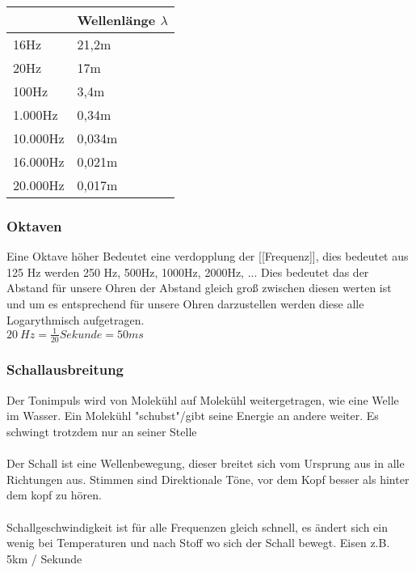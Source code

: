 \begin{table}[h]
\begin{center}
\begin{tabular}{l|l}
\hline
\rowcolor{YellowGreen!50!} \multicolumn{1}{|l|}{Frequenz} & \multicolumn{1}{l|}{Wellenlänge $\lambda$} \\ \hline
16Hz                           & 21,2m                                      \\
20Hz                           & 17m                                        \\
100Hz                          & 3,4m                                       \\
1.000Hz                        & 0,34m                                      \\
10.000Hz                       & 0,034m                                     \\
16.000Hz                       & 0,021m                                     \\
20.000Hz                       & 0,017m                                    
\end{tabular}
\end{center}
\end{table}
\newpage


    \subsubsection{Oktaven}
    Eine Oktave höher Bedeutet eine verdopplung der [[Frequenz]], dies bedeutet aus 125 Hz werden 250 Hz, 500Hz, 1000Hz, 2000Hz, ...
Dies bedeutet das der Abstand für unsere Ohren der Abstand gleich groß zwischen diesen werten ist und um es entsprechend für unsere Ohren darzustellen werden diese alle Logarythmisch aufgetragen. \\
$20~Hz = \frac{1}{20}Sekunde=50ms$


    \subsubsection{Schallausbreitung}
        Der Tonimpuls wird von Molekühl auf Molekühl weitergetragen, wie eine Welle im Wasser.  Ein Molekühl "schubst"/gibt seine Energie an andere weiter. Es schwingt trotzdem nur an seiner Stelle\\~\\
Der Schall ist eine Wellenbewegung, dieser breitet sich vom Ursprung aus in alle Richtungen aus. Stimmen sind Direktionale Töne, vor dem Kopf besser als hinter dem kopf zu hören. \\~\\
Schallgeschwindigkeit ist für alle Frequenzen gleich schnell, es ändert sich ein wenig bei Temperaturen und nach Stoff wo sich der Schall bewegt.
Eisen z.B. 5km / Sekunde

